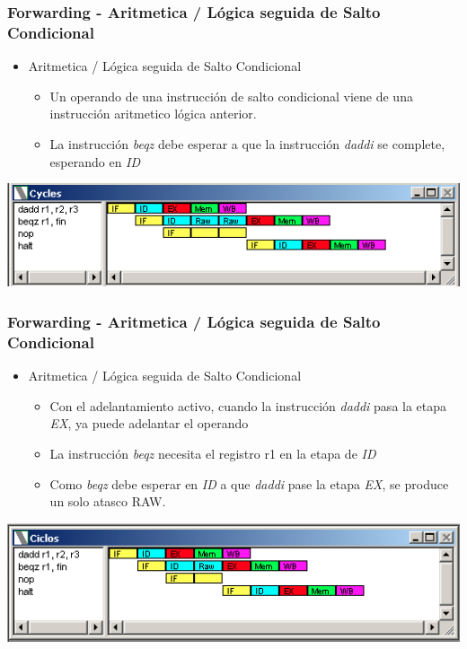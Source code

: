 \documentclass{beamer}
\begin{document}
\begin{frame}[fragile]
\frametitle{Forwarding - Aritmetica / Lógica seguida de Salto Condicional}
\begin{itemize}
\item Aritmetica / Lógica seguida de Salto Condicional
\begin{itemize}
\item Un operando de una instrucción de salto condicional viene de una instrucción aritmetico lógica anterior.
\item La instrucción \emph{beqz} debe esperar a que la instrucción \emph{daddi} se complete, esperando en \emph{ID}
\end{itemize}
\end{itemize}
\includegraphics[scale=0.45]{forwarding-6.png}
\end{frame}

\begin{frame}[fragile]
\frametitle{Forwarding - Aritmetica / Lógica seguida de Salto Condicional}
\begin{itemize}
\item Aritmetica / Lógica seguida de Salto Condicional
\begin{itemize}
\item Con el adelantamiento activo, cuando la instrucción \emph{daddi} pasa la etapa \emph{EX}, ya puede adelantar el operando
\item La instrucción \emph{beqz} necesita el registro r1 en la etapa de \emph{ID}
\item Como \emph{beqz} debe esperar en \emph{ID} a que \emph{daddi} pase la etapa \emph{EX}, se produce un solo atasco RAW.
\end{itemize}
\end{itemize}
\includegraphics[scale=0.45]{forwarding-6-aritmetica-salto-condicional.png}
\end{frame}
\end{document}
